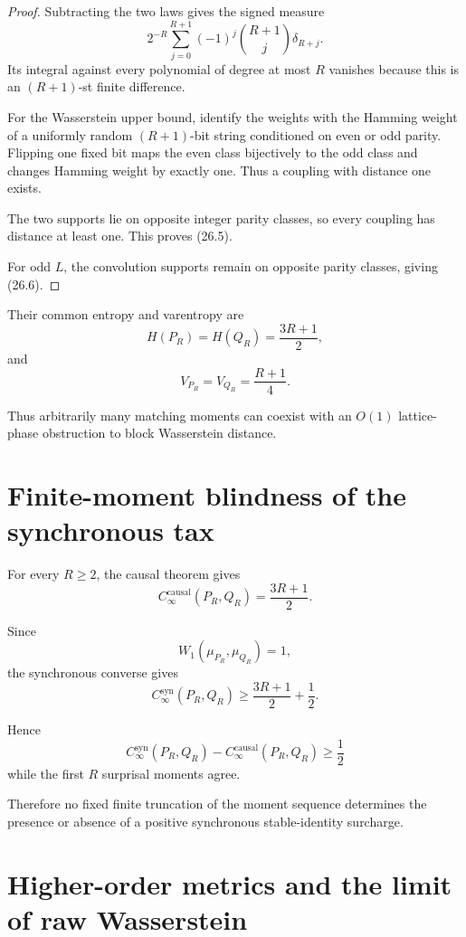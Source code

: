 \documentclass[11pt,a4paper]{article}
\newcommand{\CinfSyn}{C_{\infty}^{\mathrm{syn}}}
\newcommand{\CinfCausal}{C_{\infty}^{\mathrm{causal}}}
\newcommand{\1}{\mathbf 1}
\begin{document}
\begin{proof}
Subtracting the two laws gives the signed measure
\[
2^{-R}
\sum_{j=0}^{R+1}
(-1)^j
\binom{R+1}{j}
\delta_{R+j}.
\]
Its integral against every polynomial of degree at most \(R\) vanishes
because this is an \((R+1)\)-st finite difference.

For the Wasserstein upper bound, identify the weights with the Hamming
weight of a uniformly random \((R+1)\)-bit string conditioned on even or
odd parity.
Flipping one fixed bit maps the even class bijectively to the odd class
and changes Hamming weight by exactly one.
Thus a coupling with distance one exists.

The two supports lie on opposite integer parity classes, so every
coupling has distance at least one.
This proves (26.5).

For odd \(L\), the convolution supports remain on opposite parity
classes, giving (26.6).
\end{proof}

Their common entropy and varentropy are
\[
\boxed{
H(P_R)=H(Q_R)=\frac{3R+1}{2},
}
\tag{26.7}
\]
and
\[
\boxed{
V_{P_R}=V_{Q_R}=\frac{R+1}{4}.
}
\tag{26.8}
\]

Thus arbitrarily many matching moments can coexist with an
\(O(1)\) lattice-phase obstruction to block Wasserstein distance.


\section{Finite-moment blindness of the synchronous tax}

For every \(R\ge2\), the causal theorem gives
\[
\CinfCausal(P_R,Q_R)
=
\frac{3R+1}{2}.
\tag{27.1}
\]

Since
\[
W_1(\mu_{P_R},\mu_{Q_R})=1,
\]
the synchronous converse gives
\[
\boxed{
\CinfSyn(P_R,Q_R)
\ge
\frac{3R+1}{2}+\frac12.
}
\tag{27.2}
\]

Hence
\[
\boxed{
\CinfSyn(P_R,Q_R)
-
\CinfCausal(P_R,Q_R)
\ge
\frac12
}
\tag{27.3}
\]
while the first \(R\) surprisal moments agree.

Therefore no fixed finite truncation of the moment sequence determines
the presence or absence of a positive synchronous stable-identity
surcharge.


\section{Higher-order metrics and the limit of raw Wasserstein}
\end{document}
